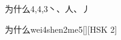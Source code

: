 \begin{entry}{为什么}{4,4,3}{⼂、⼈、⼃}
  \begin{phonetics}{为什么}{wei4shen2me5}[][HSK 2]
  \end{phonetics}
\end{entry}
